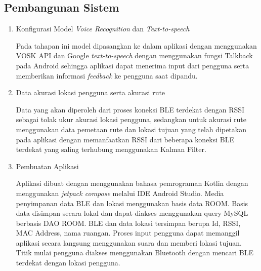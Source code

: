 \subsection{Pembangunan Sistem}
	\begin{enumerate}
	
	\item Konfigurasi Model \textit{Voice Recognition} dan \textit{Text-to-speech}
	\par Pada tahapan ini model dipasangkan ke dalam aplikasi dengan menggunakan VOSK API dan Google \textit{text-to-speech} dengan menggunakan fungsi Talkback pada Android sehingga aplikasi dapat menerima input dari pengguna serta memberikan informasi \textit{feedback} ke pengguna saat dipandu.
	
	\item  Data akurasi lokasi pengguna serta akurasi rute
\par Data yang akan diperoleh dari proses koneksi BLE terdekat dengan RSSI sebagai tolak ukur akurasi lokasi pengguna, sedangkan untuk akurasi rute menggunakan data pemetaan rute dan lokasi tujuan yang telah dipetakan pada aplikasi dengan memanfaatkan RSSI dari beberapa koneksi BLE terdekat yang saling terhubung menggunakan Kalman Filter.

	\item Pembuatan Aplikasi
	\par Aplikasi dibuat dengan menggunakan bahasa pemrograman Kotlin dengan menggunakan \textit{jetpack compose} melalui IDE Android Studio. Media penyimpanan data BLE dan lokasi menggunakan basis data ROOM. Basis data disimpan secara lokal dan dapat diakses menggunakan query MySQL berbasis DAO ROOM. BLE dan data lokasi tersimpan berupa Id, RSSI, MAC Address, nama ruangan. Proses input pengguna dapat memanggil aplikasi secara langsung menggunakan suara dan memberi lokasi tujuan. Titik mulai pengguna diakses menggunakan Bluetooth dengan mencari BLE terdekat dengan lokasi pengguna.
	

\end{enumerate}
